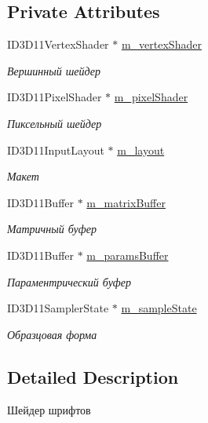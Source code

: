 \subsection*{Private Attributes}
\begin{DoxyCompactItemize}
\item 
I\+D3\+D11\+Vertex\+Shader $\ast$ \hyperlink{class_font_shader_class_ac751ad1109a8cf0db40ebacd7ae93dbf}{m\+\_\+vertex\+Shader}
\begin{DoxyCompactList}\small\item\em Вершинный шейдер \end{DoxyCompactList}\item 
I\+D3\+D11\+Pixel\+Shader $\ast$ \hyperlink{class_font_shader_class_a7fd5426bc5bc2d3986258a3b7b9f3a44}{m\+\_\+pixel\+Shader}
\begin{DoxyCompactList}\small\item\em Пиксельный шейдер \end{DoxyCompactList}\item 
I\+D3\+D11\+Input\+Layout $\ast$ \hyperlink{class_font_shader_class_a40e8b4da493597bed19d2865ebee757b}{m\+\_\+layout}
\begin{DoxyCompactList}\small\item\em Макет \end{DoxyCompactList}\item 
I\+D3\+D11\+Buffer $\ast$ \hyperlink{class_font_shader_class_a60f6476e19bd489e7eab99aafbc9310c}{m\+\_\+matrix\+Buffer}
\begin{DoxyCompactList}\small\item\em Матричный буфер \end{DoxyCompactList}\item 
I\+D3\+D11\+Buffer $\ast$ \hyperlink{class_font_shader_class_a832f2ec6468aa373482dcca2c7360430}{m\+\_\+params\+Buffer}
\begin{DoxyCompactList}\small\item\em Параментрический буфер \end{DoxyCompactList}\item 
I\+D3\+D11\+Sampler\+State $\ast$ \hyperlink{class_font_shader_class_af9fcbffdb92fe0d3be93ef9b767c5994}{m\+\_\+sample\+State}
\begin{DoxyCompactList}\small\item\em Образцовая форма \end{DoxyCompactList}\end{DoxyCompactItemize}


\subsection{Detailed Description}
Шейдер шрифтов 

